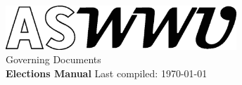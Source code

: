 \documentclass[10pt, letterpaper]{article}
\begin{document}
\nolinenumbers
\begin{titlepage}
    \begin{center}
        \vspace*{5cm}
  		\includegraphics[width=0.65\textwidth]{Formatting/Logo_ASWWU-Black}\\
        \LARGE Governing Documents\\ \Huge \textbf{Elections Manual}
        \vfill
        \normalsize Last compiled: \today\ \currenttime
             
    \end{center}
 \end{titlepage}
\setcounter{tocdepth}{2}
\tableofcontents
\linenumbers
\newpage
\end{document}

